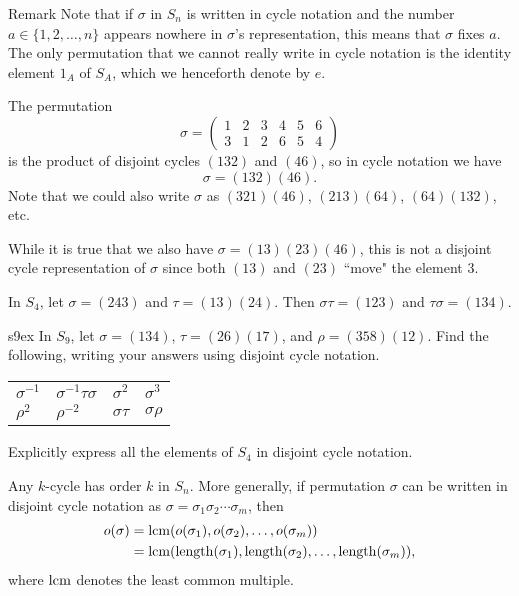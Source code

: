 \begin{df}{Remark} Note that if $\sigma$ in $S_n$ is
written in cycle notation and the number $a\in \{1,2,\ldots, n\}$
appears nowhere in $\sigma$'s representation, this means that
$\sigma$ fixes $a$. The only permutation that we cannot really write
in cycle notation is the identity element $1_A$ of $S_A$, which we
henceforth denote by $e$.\end{df}


\begin{example}{} The permutation $$\sigma =\left(\begin{array}{cccccc}1&2&3&4&5&6\\ 3&1&2&6&5&4\end{array}\right)$$ is the product of disjoint cycles
$(132)$ and $(46)$, so in cycle notation we have $$\sigma=(132)(46).$$  Note that we could also write $\sigma$ as $(321)(46)$, $(213)(64)$, $(64)(132)$, etc.
\medskip

While it is true that we also have $\sigma=(13)(23)(46)$, this is not a disjoint cycle representation of $\sigma$ since both $(13)$ and $(23)$ ``move" the element $3$. \end{example}

\begin{example}{} In $S_4$, let $\sigma=(243)$ and $\tau=(13)(24)$. Then $\sigma \tau=(123)$ and $\tau \sigma = (134). $
\end{example}

\begin{example}{s9ex} In $S_9$, let $\sigma=(134)$, $\tau=(26)(17)$, and $\rho=(358)(12)$.  Find the following, writing your answers using disjoint cycle notation.

\begin{center}
\renewcommand{\arraystretch}{1.3}
\begin{tabular}{p{1in}p{1in}p{1in}p{1in}}
$\sigma^{-1}$
&$\sigma^{-1}\tau\sigma$
&$\sigma^2$
&$\sigma^3$\\
$\rho^2$
&$\rho^{-2}$
&$\sigma \tau$
&$\sigma \rho $
\end{tabular}
\end{center}
\end{example}

\begin{example}{} Explicitly express all the elements of $S_4$ in disjoint cycle notation. \end{example}

\begin{thm}\label{kcyc} Any $k$-cycle has order $k$ in $S_n$. More generally, if permutation $\sigma$ can be written in disjoint cycle notation as $\sigma=\sigma_1 \sigma_2 \cdots \sigma_m$, then
\begin{align*}
o(\sigma)&=\operatorname{lcm}(o(\sigma_1), o(\sigma_2),\ldots, o(\sigma_m))\\
&=\operatorname{lcm}(\mathrm{length}(\sigma_1),\mathrm{length}(\sigma_2),\ldots,\mathrm{length}(\sigma_m)), \end{align*} where $\operatorname{lcm}$ denotes the least common multiple.
\end{thm}


